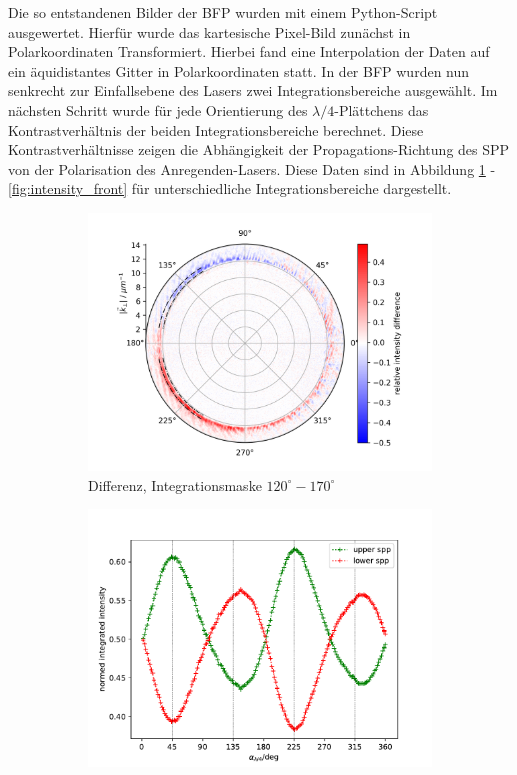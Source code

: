 \documentclass[titlepage]{article}
\begin{document}
	Die so entstandenen Bilder der BFP wurden mit einem Python-Script ausgewertet. Hierfür wurde das kartesische Pixel-Bild zunächst in Polarkoordinaten Transformiert. Hierbei fand eine Interpolation der Daten auf ein äquidistantes Gitter in Polarkoordinaten statt. In der BFP wurden nun senkrecht zur Einfallsebene des Lasers zwei Integrationsbereiche ausgewählt. Im nächsten Schritt wurde für jede Orientierung des $\lambda/4$-Plättchens das Kontrastverhältnis der beiden Integrationsbereiche berechnet. Diese Kontrastverhältnisse zeigen die Abhängigkeit der Propagations-Richtung des SPP von der Polarisation des Anregenden-Lasers. Diese Daten sind in Abbildung \ref{fig:diff_back} - \ref{fig:intensity_front} für unterschiedliche Integrationsbereiche dargestellt.
	\begin{figure}
		\label{fig:spin_hall_measure}
		\centering
		\begin{subfigure}[b]{0.5\textwidth}
			\centering
			\includegraphics[width=\textwidth]{figures/spin_hall/diff_back.png}
			\caption{Differenz, Integrationsmaske $120^\circ-170^\circ$}
			\label{fig:diff_back}
		\end{subfigure}
		\hfill
		\begin{subfigure}[b]{0.49\textwidth}
			\centering
			\includegraphics[width=\textwidth]{figures/spin_hall/intensity_back.pdf}

\end{subfigure}
\end{figure}
\end{document}
